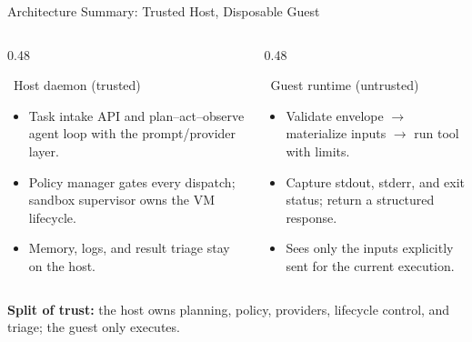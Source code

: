 \documentclass[aspectratio=169,11pt]{beamer}
\begin{document}
\begin{frame}{Architecture Summary: Trusted Host, Disposable Guest}
  \scriptsize
  \begin{columns}[T,totalwidth=\textwidth]
    \begin{column}{0.48\textwidth}
      \begin{block}{\faServer\ Host daemon (trusted)}
        \begin{itemize}
          \item Task intake API and plan--act--observe agent loop with the
            prompt/provider layer.
          \item Policy manager gates every dispatch; sandbox supervisor owns
            the VM lifecycle.
          \item Memory, logs, and result triage stay on the host.
        \end{itemize}
      \end{block}
    \end{column}
    \begin{column}{0.48\textwidth}
      \begin{exampleblock}{\faLock\ Guest runtime (untrusted)}
        \begin{itemize}
          \item Validate envelope \(\rightarrow\) materialize inputs
            \(\rightarrow\) run tool with limits.
          \item Capture stdout, stderr, and exit status; return a structured
            response.
          \item Sees only the inputs explicitly sent for the current execution.
        \end{itemize}
      \end{exampleblock}
    \end{column}
  \end{columns}
  \vspace{0.25cm}
  \centering
  \textbf{Split of trust:} the host owns planning, policy, providers, lifecycle
  control, and triage; the guest only executes.
\end{frame}
\end{document}
